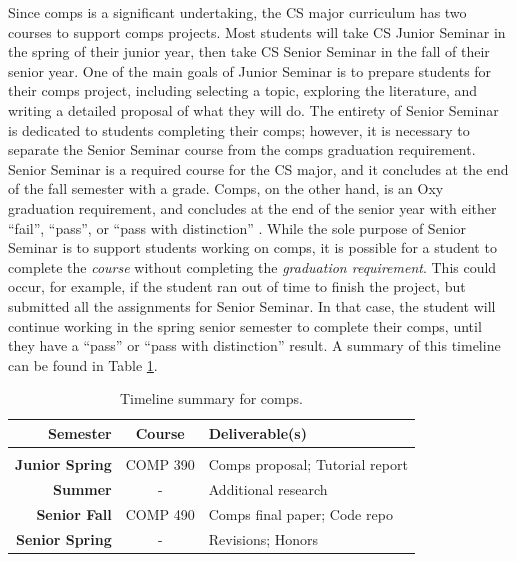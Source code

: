 \documentclass[10pt,twocolumn]{article}
\begin{document}
Since comps is a significant undertaking, the CS major curriculum has two courses to support comps projects.
Most students will take CS Junior Seminar in the spring of their junior year, then take CS Senior Seminar in the fall of their senior year.
One of the main goals of Junior Seminar is to prepare students for their comps project, including selecting a topic, exploring the literature, and writing a detailed proposal of what they will do.
The entirety of Senior Seminar is dedicated to students completing their comps; however, it is necessary to separate the Senior Seminar course from the comps graduation requirement.
Senior Seminar is a required course for the CS major, and it concludes at the end of the fall semester with a grade.
Comps, on the other hand, is an Oxy graduation requirement, and concludes at the end of the senior year with either ``fail'', ``pass'', or ``pass with distinction'' \cite{OccidentalComps}.
While the sole purpose of Senior Seminar is to support students working on comps, it is possible for a student to complete the \textit{course} without completing the \textit{graduation requirement}.
This could occur, for example, if the student ran out of time to finish the project, but submitted all the assignments for Senior Seminar.
In that case, the student will continue working in the spring senior semester to complete their comps, until they have a ``pass'' or ``pass with distinction'' result.
A summary of this timeline can be found in Table \ref{tbl:timeline}.

\begin{table}
    \footnotesize
    \begin{tabular}{r|cl}
        \textbf{Semester}       &  \textbf{Course}  &  \textbf{Deliverable(s)}          \\
        \hline \\
        \textbf{Junior Spring}  &  COMP 390         &  Comps proposal; Tutorial report  \\
        \textbf{Summer}         &  -                &  Additional research              \\
        \textbf{Senior Fall}    &  COMP 490         &  Comps final paper; Code repo     \\
        \textbf{Senior Spring}  &  -                &  Revisions; Honors                \\
    \end{tabular}
    \caption{Timeline summary for comps.}
    \label{tbl:timeline}
\end{table}
\end{document}
